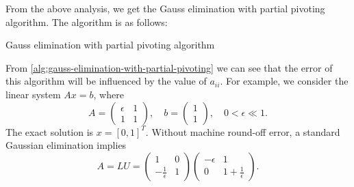 \documentclass[a4paper]{article}
\theoremstyle{definition}
\begin{document}
From the above analysis, we get the Gauss elimination with partial pivoting algorithm. The algorithm is as follows:
\begin{algorithm}[H]
  \caption{Gauss elimination with partial pivoting algorithm}
  \label{alg:gauss-elimination-with-partial-pivoting}
\end{algorithm}

From \cref{alg:gauss-elimination-with-partial-pivoting} we can see that the error of this algorithm will be influenced by the value of $a_{ii}$. For example, we consider the linear system $Ax = b$, where 
\begin{equation}
  A = \begin{pmatrix}
    \epsilon & 1 \\
    1 & 1
  \end{pmatrix}, \quad b = \begin{pmatrix}
    1 \\ 1
  \end{pmatrix}, \quad 0 < \epsilon \ll 1.
  \label{eq:linear-system-with-small-values}
\end{equation}
The exact solution is $x = [0, 1]^T$. Without machine round-off error, a standard Gaussian elimination implies 
\begin{equation}
  A = LU = \begin{pmatrix}
    1 & 0 \\ 
    -\frac{1}{\epsilon} & 1
  \end{pmatrix}
  \begin{pmatrix}
    -\epsilon & 1 \\
    0 & 1 + \frac{1}{\epsilon} 
  \end{pmatrix}.
  \label{eq:lu-decomposition-with-small-values}
\end{equation}
\end{document}
